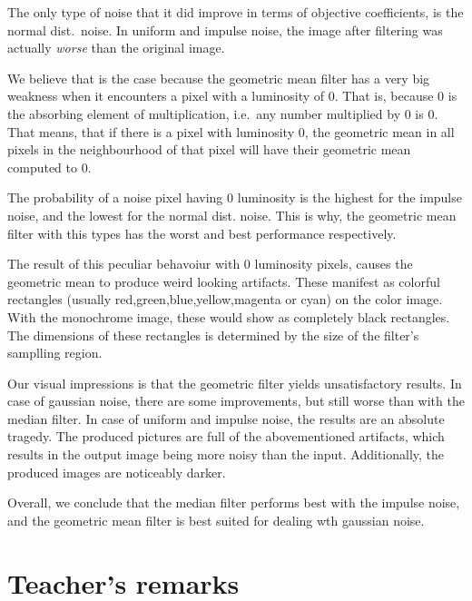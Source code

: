 \documentclass[12pt]{article}
\begin{document}
The only type of noise that it did improve in terms of objective coefficients, is the normal dist.\ noise.
In uniform and impulse noise, the image after filtering was actually \emph{worse} than the original image.

We believe that is the case because the geometric mean filter has a very big weakness when it encounters a pixel with a luminosity of 0.
That is, because 0 is the absorbing element of multiplication, i.e.\ any number multiplied by 0 is 0.
That means, that if there is a pixel with luminosity 0, the geometric mean in all pixels in the neighbourhood of that pixel will have their geometric mean computed to 0.

The probability of a noise pixel having 0 luminosity is the highest for the impulse noise,
and the lowest for the normal dist. noise.
This is why, the geometric mean filter with this types has the worst and best performance respectively.

The result of this peculiar behavoiur with 0 luminosity pixels, causes the geometric mean to produce weird looking artifacts.
These manifest as colorful rectangles (usually red,green,blue,yellow,magenta or cyan) on the color image.
With the monochrome image,
these would show as completely black rectangles.
The dimensions of these rectangles is determined by the size of the filter's samplling region.

Our visual impressions is that the geometric filter yields unsatisfactory results.
In case of gaussian noise, there are some improvements, but still worse than with the median filter.
In case of uniform and impulse noise, the results are an absolute tragedy. The produced pictures are full of the abovementioned artifacts,
which results in the output image being more noisy than the input.
Additionally, the produced images are noticeably darker.

Overall, we conclude that the median filter performs best with the impulse noise, and the geometric mean filter is best suited for dealing wth gaussian noise.

\clearpage
\vfill
\section*{Teacher's remarks}
\begin{tabularx}{\textwidth}{|X|}
    \hline
    \vspace{7cm}
    \phantom{.} \\
    \hline
\end{tabularx}
\end{document}
